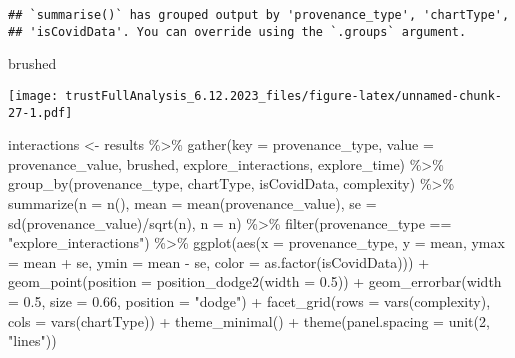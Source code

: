 \documentclass[
]{article}
\newenvironment{Shaded}{\begin{snugshade}}{\end{snugshade}}
\newcommand{\AttributeTok}[1]{\textcolor[rgb]{0.77,0.63,0.00}{#1}}
\newcommand{\DecValTok}[1]{\textcolor[rgb]{0.00,0.00,0.81}{#1}}
\newcommand{\FloatTok}[1]{\textcolor[rgb]{0.00,0.00,0.81}{#1}}
\newcommand{\FunctionTok}[1]{\textcolor[rgb]{0.00,0.00,0.00}{#1}}
\newcommand{\NormalTok}[1]{#1}
\newcommand{\OtherTok}[1]{\textcolor[rgb]{0.56,0.35,0.01}{#1}}
\newcommand{\SpecialCharTok}[1]{\textcolor[rgb]{0.00,0.00,0.00}{#1}}
\newcommand{\StringTok}[1]{\textcolor[rgb]{0.31,0.60,0.02}{#1}}
\begin{document}
\begin{verbatim}
## `summarise()` has grouped output by 'provenance_type', 'chartType',
## 'isCovidData'. You can override using the `.groups` argument.
\end{verbatim}

\begin{Shaded}
\begin{Highlighting}[]
\NormalTok{brushed}
\end{Highlighting}
\end{Shaded}

\texttt{[image: trustFullAnalysis\_6.12.2023\_files/figure-latex/unnamed-chunk-27-1.pdf]}

\begin{Shaded}
\begin{Highlighting}[]
\NormalTok{interactions }\OtherTok{\textless{}{-}}\NormalTok{ results }\SpecialCharTok{\%\textgreater{}\%}
  \FunctionTok{gather}\NormalTok{(}\AttributeTok{key =}\NormalTok{ provenance\_type, }\AttributeTok{value =}\NormalTok{ provenance\_value, brushed, explore\_interactions, explore\_time) }\SpecialCharTok{\%\textgreater{}\%}
  \FunctionTok{group\_by}\NormalTok{(provenance\_type, chartType, isCovidData, complexity) }\SpecialCharTok{\%\textgreater{}\%}
  \FunctionTok{summarize}\NormalTok{(}\AttributeTok{n =} \FunctionTok{n}\NormalTok{(), }
            \AttributeTok{mean =} \FunctionTok{mean}\NormalTok{(provenance\_value), }
            \AttributeTok{se =} \FunctionTok{sd}\NormalTok{(provenance\_value)}\SpecialCharTok{/}\FunctionTok{sqrt}\NormalTok{(n),}
            \AttributeTok{n =}\NormalTok{ n) }\SpecialCharTok{\%\textgreater{}\%}
  \FunctionTok{filter}\NormalTok{(provenance\_type }\SpecialCharTok{==} \StringTok{"explore\_interactions"}\NormalTok{) }\SpecialCharTok{\%\textgreater{}\%}
  \FunctionTok{ggplot}\NormalTok{(}\FunctionTok{aes}\NormalTok{(}\AttributeTok{x =}\NormalTok{ provenance\_type, }\AttributeTok{y =}\NormalTok{ mean, }\AttributeTok{ymax =}\NormalTok{ mean }\SpecialCharTok{+}\NormalTok{ se, }\AttributeTok{ymin =}\NormalTok{ mean }\SpecialCharTok{{-}}\NormalTok{ se, }\AttributeTok{color =} \FunctionTok{as.factor}\NormalTok{(isCovidData))) }\SpecialCharTok{+}
  \FunctionTok{geom\_point}\NormalTok{(}\AttributeTok{position =} \FunctionTok{position\_dodge2}\NormalTok{(}\AttributeTok{width =} \FloatTok{0.5}\NormalTok{)) }\SpecialCharTok{+}
  \FunctionTok{geom\_errorbar}\NormalTok{(}\AttributeTok{width =} \FloatTok{0.5}\NormalTok{, }\AttributeTok{size =} \FloatTok{0.66}\NormalTok{, }\AttributeTok{position =} \StringTok{"dodge"}\NormalTok{) }\SpecialCharTok{+}
  \FunctionTok{facet\_grid}\NormalTok{(}\AttributeTok{rows =} \FunctionTok{vars}\NormalTok{(complexity), }\AttributeTok{cols =} \FunctionTok{vars}\NormalTok{(chartType)) }\SpecialCharTok{+} 
  \FunctionTok{theme\_minimal}\NormalTok{() }\SpecialCharTok{+}
  \FunctionTok{theme}\NormalTok{(}\AttributeTok{panel.spacing =} \FunctionTok{unit}\NormalTok{(}\DecValTok{2}\NormalTok{, }\StringTok{"lines"}\NormalTok{))}
\end{Highlighting}
\end{Shaded}
\end{document}
